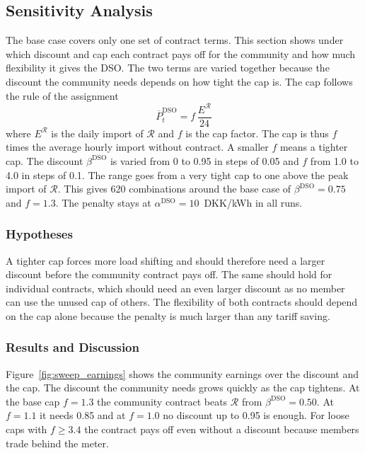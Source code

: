 \subsection{Sensitivity Analysis}\label{sec:sensitivity}
The base case covers only one set of contract terms.
This section shows under which discount and cap each contract pays off for the community and how much flexibility it gives the DSO.
The two terms are varied together because the discount the community needs depends on how tight the cap is.
The cap follows the rule of the assignment
\begin{equation}
    \overline{P}^{\mathrm{DSO}}_t = f\,\frac{E^{\mathcal{R}}}{24}
    \label{eq:cap}
\end{equation}
where $E^{\mathcal{R}}$ is the daily import of $\mathcal{R}$ and $f$ is the cap factor.
The cap is thus $f$ times the average hourly import without contract.
A smaller $f$ means a tighter cap.
The discount $\beta^{\mathrm{DSO}}$ is varied from 0 to 0.95 in steps of 0.05 and $f$ from 1.0 to 4.0 in steps of 0.1.
The range goes from a very tight cap to one above the peak import of $\mathcal{R}$.
This gives 620 combinations around the base case of $\beta^{\mathrm{DSO}}=0.75$ and $f=1.3$.
The penalty stays at $\alpha^{\mathrm{DSO}}=10$~DKK/kWh in all runs.



\subsubsection{Hypotheses}
A tighter cap forces more load shifting and should therefore need a larger discount before the community contract pays off.
The same should hold for individual contracts, which should need an even larger discount as no member can use the unused cap of others.
The flexibility of both contracts should depend on the cap alone because the penalty is much larger than any tariff saving.

\subsubsection{Results and Discussion}

Figure~\ref{fig:sweep_earnings} shows the community earnings over the discount and the cap.
The discount the community needs grows quickly as the cap tightens. At the base cap $f=1.3$ the community contract beats $\mathcal{R}$ from $\beta^{\mathrm{DSO}}=0.50$.
At $f=1.1$ it needs 0.85 and at $f=1.0$ no discount up to 0.95 is enough. For loose caps with $f\geq 3.4$ the contract pays off even without a discount because members trade behind the meter.

